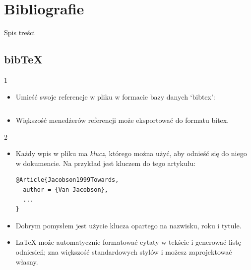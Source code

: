 \documentclass{beamer}
\begin{document}
\section{Bibliografie}

\begin{frame}{Spis treści}
\begin{multicols}{2}
\tableofcontents[currentsection]
\end{multicols}
\end{frame}

\subsection{bib\TeX}
\begin{frame}[fragile]{\insertsubsection{} 1}
\begin{itemize}
\item Umieść swoje referencje w pliku  w formacie bazy danych `bibtex':
\inputminted[fontsize=\scriptsize,frame=single]{latex}{bib-przyklad.bib}
\item Większość menedżerów referencji może eksportować do formatu bitex.
\end{itemize}
\end{frame}

\begin{frame}[fragile]{\insertsubsection{} 2}
\begin{itemize}
\item Każdy wpis w pliku  ma \emph{klucz}, którego można
użyć, aby odnieść się do niego w dokumencie. Na przykład  jest kluczem do tego artykułu:
\begin{verbatim}
@Article{Jacobson1999Towards,
  author = {Van Jacobson},
  ...
}
\end{verbatim}
\item Dobrym pomysłem jest użycie klucza opartego na nazwisku, roku i tytule.
\item \LaTeX{} może automatycznie formatować cytaty w tekście i 
generować listę odniesień; zna większość standardowych stylów i 
możesz zaprojektować własny.
\end{itemize}
\end{frame}
\end{document}
